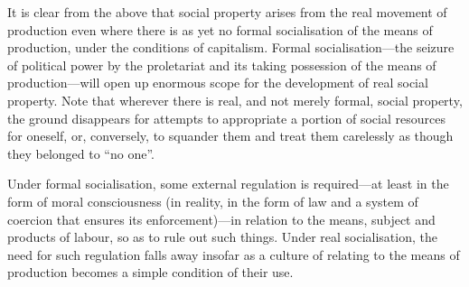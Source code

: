 \documentclass[../main]{subfiles}
\begin{document}
It is clear from the above that social property arises from the real movement of production even where there is as yet no formal socialisation of the means of production, under the conditions of capitalism. Formal socialisation—the seizure of political power by the proletariat and its taking possession of the means of production—will open up enormous scope for the development of real social property. Note that wherever there is real, and not merely formal, social property, the ground disappears for attempts to appropriate a portion of social resources for oneself, or, conversely, to squander them and treat them carelessly as though they belonged to “no one”.

Under formal socialisation, some external regulation is required—at least in the form of moral consciousness (in reality, in the form of law and a system of coercion that ensures its enforcement)—in relation to the means, subject and products of labour, so as to rule out such things. Under real socialisation, the need for such regulation falls away insofar as a culture of relating to the means of production becomes a simple condition of their use.
\end{document}
